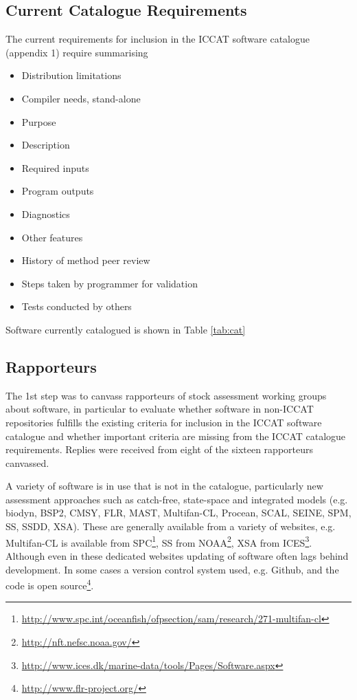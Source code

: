 \documentclass[a4paper,10pt]{article}
\begin{document}
\subsection*{Current Catalogue Requirements}

The current requirements for inclusion in the ICCAT software catalogue (appendix 1) require summarising   
\begin{itemize}
 \item Distribution limitations
 \item Compiler needs, stand-alone
 \item Purpose
 \item Description
 \item Required inputs
 \item Program outputs
 \item Diagnostics
 \item Other features
 \item History of method peer review
 \item Steps taken by programmer for validation
 \item Tests conducted by others
\end{itemize}

Software currently catalogued is shown in Table \ref{tab:cat}

\subsection*{Rapporteurs}

The 1st step was to canvass rapporteurs of stock assessment working groups about software, in particular to evaluate whether software in non-ICCAT repositories fulfills the existing criteria for inclusion in the ICCAT software catalogue and whether important criteria are missing from the ICCAT catalogue requirements. Replies were received from eight of the sixteen rapporteurs canvassed. 

A variety of software is in use that is not in the catalogue, particularly new assessment approaches such as catch-free, state-space and integrated models (e.g. biodyn, BSP2, CMSY,  FLR, MAST,  Multifan-CL,  Procean, SCAL, SEINE, SPM,  SS, SSDD, XSA). These are generally available from a variety of websites, e.g. Multifan-CL is available from SPC\footnote{\url{http://www.spc.int/oceanfish/ofpsection/sam/research/271-multifan-cl}}, SS from NOAA\footnote{\url{http://nft.nefsc.noaa.gov/}}, XSA from ICES\footnote{\url{http://www.ices.dk/marine-data/tools/Pages/Software.aspx}}. Although even in these dedicated websites updating of software often lags behind development. In some cases a version control system used, e.g. Github, and the code is open source\footnote{\url{http://www.flr-project.org/}}.
\end{document}
